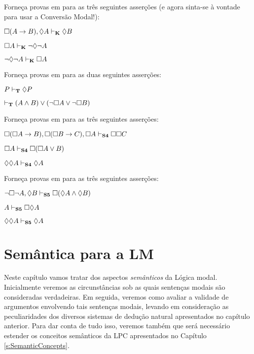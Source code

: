 \problempart
Forneça provas  em \mlK{}  para as três seguintes asserções (e agora sinta-se à vontade para usar a Conversão Modal!):
\begin{earg}
	\item $\Box(A\rightarrow B), \Diamond A \vdash_{\mathbf{K}} \Diamond B$
	\item $\Box A \vdash_{\mathbf{K}} \neg\Diamond\neg A$
	\item $\neg\Diamond\neg A \vdash_{\mathbf{K}} \Box A$
\end{earg}

\problempart
Forneça provas em  \mlT{} para as duas seguintes asserções:
\begin{earg}
	\item $P\vdash_{\mathbf{T}}\Diamond P$
	\item $\vdash_{\mathbf{T}} (A\wedge B)\vee(\neg \Box A\vee\neg\Box B)$
\end{earg}

\problempart
Forneça provas em  \mlSfour{}  para as três seguintes asserções:
\begin{earg}
	\item $\Box(\Box A\rightarrow B), \Box (\Box B\rightarrow C), \Box A \vdash_{\mathbf{S4}} \Box\Box C$
	\item $\Box A \vdash_{\mathbf{S4}} \Box(\Box A \vee B)$
	\item $\Diamond \Diamond A \vdash_{\mathbf{S4}} \Diamond A$
\end{earg}

\problempart
Forneça provas em \mlSfive{} para as três seguintes asserções:
\begin{earg}
	\item $\neg\Box\neg A, \Diamond B\vdash_{\mathbf{S5}} \Box(\Diamond A \wedge \Diamond B)$
	\item $A \vdash_{\mathbf{S5}}  \Box\Diamond A$
	\item $\Diamond\Diamond A\vdash_{\mathbf{S5}}  \Diamond A$
\end{earg}

\chapter{Semântica para  a  LM}
\label{Semantics}

Neste capítulo vamos tratar dos aspectos \emph{semânticos} da Lógica modal.  Inicialmente veremos as circunstâncias sob as quais sentenças modais são consideradas verdadeiras. Em seguida, veremos como avaliar a validade de argumentos envolvendo tais sentenças modais, levando em consideração as peculiaridades dos diversos sistemas  de  dedução natural  apresentados no capítulo anterior. Para dar conta de tudo isso, veremos também  que será necessário  estender os conceitos semânticos da LPC apresentados no Capítulo \ref{s:SemanticConcepts}. 

